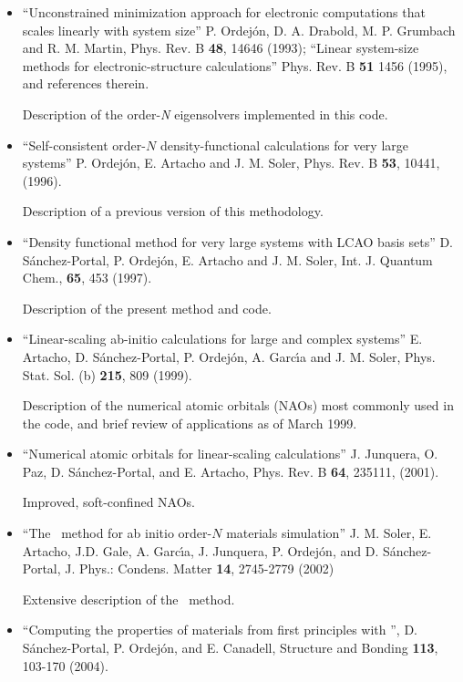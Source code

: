 \begin{itemize}

\item
``Unconstrained minimization approach for electronic computations
that scales linearly with system size''
P. Ordej\'on, D. A. Drabold, M. P. Grumbach and R. M. Martin,
Phys. Rev. B \textbf{48}, 14646 (1993);
``Linear system-size methods for electronic-structure calculations''
Phys. Rev. B \textbf{51} 1456 (1995), and references therein.

Description of the order-\textit{N} eigensolvers
implemented in this code.

\item
``Self-consistent order-$N$ density-functional
calculations for very large systems''
P. Ordej\'on, E. Artacho and J. M. Soler,
Phys. Rev. B \textbf{53}, 10441, (1996).

Description of a previous version of this methodology.

\item
``Density functional method for very large systems with LCAO basis sets''
D. S\'anchez-Portal, P. Ordej\'on, E. Artacho and J. M. Soler,
Int. J. Quantum Chem., \textbf{65}, 453 (1997).

Description of the present method and code.

\item
``Linear-scaling ab-initio calculations for large and complex systems''
E. Artacho, D. S\'anchez-Portal, P. Ordej\'on, A. Garc\'{\i}a and
J. M. Soler, Phys. Stat. Sol. (b) \textbf{215}, 809 (1999).

Description of the numerical atomic orbitals (NAOs) most commonly
used in the code, and brief review of applications as of March 1999.

\item
``Numerical atomic orbitals for linear-scaling calculations''
J. Junquera, O. Paz, D. S\'anchez-Portal, and E. Artacho, Phys. Rev. B
 \textbf{64}, 235111, (2001).

Improved, soft-confined NAOs.

\item
``The \siesta\ method for ab initio order-$N$ materials simulation''
J. M. Soler, E. Artacho, J.D. Gale, A. Garc\'{\i}a, J. Junquera, P. Ordej\'on,
and D. S\'anchez-Portal, J. Phys.: Condens. Matter \textbf{14}, 2745-2779 (2002)

Extensive description of the \siesta\ method.

\item
``Computing the properties of materials from first principles
with  \siesta'', D. S\'anchez-Portal, P. Ordej\'on,
and E. Canadell, Structure and Bonding \textbf{113},
103-170 (2004).


\end{itemize}

